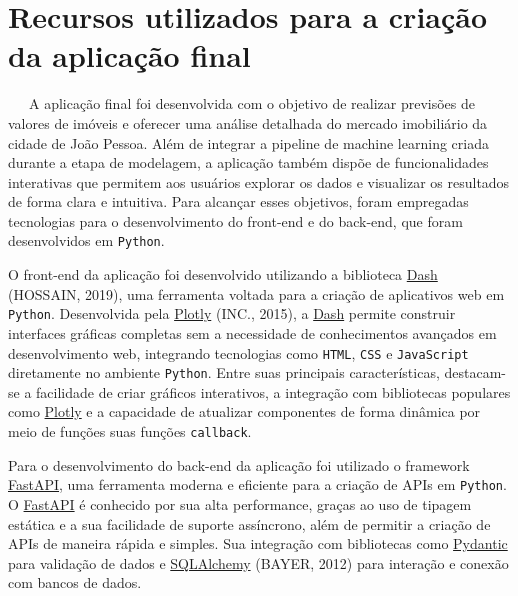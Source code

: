 \documentclass[
  12pt,
  a4paper,
]{scrreprt}
\begin{document}
\section{Recursos utilizados para a criação da aplicação
final}\label{recursos-utilizados-para-a-criauxe7uxe3o-da-aplicauxe7uxe3o-final}

~~~A aplicação final foi desenvolvida com o objetivo de realizar
previsões de valores de imóveis e oferecer uma análise detalhada do
mercado imobiliário da cidade de João Pessoa. Além de integrar a
pipeline de machine learning criada durante a etapa de modelagem, a
aplicação também dispõe de funcionalidades interativas que permitem aos
usuários explorar os dados e visualizar os resultados de forma clara e
intuitiva. Para alcançar esses objetivos, foram empregadas tecnologias
para o desenvolvimento do front-end e do back-end, que foram
desenvolvidos em \texttt{Python}.

\vspace{12pt}

O front-end da aplicação foi desenvolvido utilizando a biblioteca
\href{https://dash.plotly.com/}{Dash} (HOSSAIN, 2019), uma ferramenta
voltada para a criação de aplicativos web em \texttt{Python}.
Desenvolvida pela \href{https://plotly.com/}{Plotly} (INC., 2015), a
\href{https://dash.plotly.com/}{Dash} permite construir interfaces
gráficas completas sem a necessidade de conhecimentos avançados em
desenvolvimento web, integrando tecnologias como \texttt{HTML},
\texttt{CSS} e \texttt{JavaScript} diretamente no ambiente
\texttt{Python}. Entre suas principais características, destacam-se a
facilidade de criar gráficos interativos, a integração com bibliotecas
populares como \href{https://plotly.com/}{Plotly} e a capacidade de
atualizar componentes de forma dinâmica por meio de funções suas funções
\texttt{callback}.

\vspace{12pt}

Para o desenvolvimento do back-end da aplicação foi utilizado o
framework \href{https://fastapi.tiangolo.com/}{FastAPI}, uma ferramenta
moderna e eficiente para a criação de APIs em \texttt{Python}. O
\href{https://fastapi.tiangolo.com/}{FastAPI} é conhecido por sua alta
performance, graças ao uso de tipagem estática e a sua facilidade de
suporte assíncrono, além de permitir a criação de APIs de maneira rápida
e simples. Sua integração com bibliotecas como
\href{https://docs.pydantic.dev/latest/}{Pydantic} para validação de
dados e \href{https://www.sqlalchemy.org/}{SQLAlchemy} (BAYER, 2012)
para interação e conexão com bancos de dados.
\end{document}

